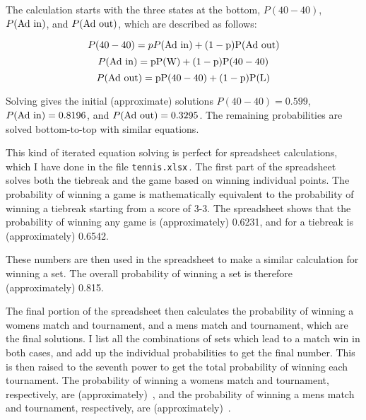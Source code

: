 \documentclass{article}
\begin{document}
The calculation starts with the three states at the bottom, $P(40-40)$, $P(\rm{Ad\ in})$, and $P(\rm{Ad\ out})$, which are described as follows:

\[
P(40-40)=pP(\rm{Ad\ in})+(1-p)P(\rm{Ad\ out})
\]
\[
P(\rm{Ad\ in})=pP(\rm{W})+(1-p)P(40-40)
\]
\[
P(\rm{Ad\ out})=pP(40-40)+(1-p)P(\rm{L})
\]

Solving gives the initial (approximate) solutions $P(40-40)=0.599$, $P(\rm{Ad\ in})=0.8196$, and $P(\rm{Ad\ out})=0.3295$.
The remaining probabilities are solved bottom-to-top with similar equations.

This kind of iterated equation solving is perfect for spreadsheet calculations, which I have done in the file \texttt{tennis.xlsx}\,.
The first part of the spreadsheet solves both the tiebreak and the game based on winning individual points.
The probability of winning a game is mathematically equivalent to the probability of winning a tiebreak starting from a score of 3-3.
The spreadsheet shows that the probability of winning any game is (approximately) 0.6231, and for a tiebreak is (approximately) 0.6542.

These numbers are then used in the spreadsheet to make a similar calculation for winning a set.
The overall probability of winning a set is therefore (approximately) 0.815.

The final portion of the spreadsheet then calculates the probability of winning a womens match and tournament, and a mens match and tournament, which are the final solutions.
I list all the combinations of sets which lead to a match win in both cases, and add up the individual probabilities to get the final number.
This is then raised to the seventh power to get the total probability of winning each tournament.
The probability of winning a womens match and tournament, respectively, are (approximately)
\,,
and the probability of winning a mens match and tournament, respectively, are (approximately)
\,.


\end{document}

